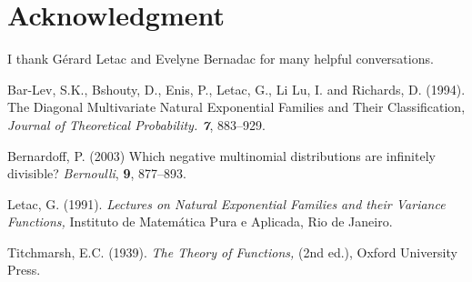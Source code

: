 \documentclass[a4paper,oneside,notitlepage]{article}%
\begin{document}
\section{Acknowledgment}

I thank G\'{e}rard Letac and Evelyne Bernadac for many helpful conversations.

\begin{thebibliography}{9}                                                                                                %


Bar-Lev, S.K., Bshouty, D., Enis, P., Letac, G., Li Lu, I. and
Richards, D. (1994). The Diagonal Multivariate Natural Exponential Families
and Their Classification, \textit{Journal of Theoretical Probability.
\textbf{7}}, 883--929.

Bernardoff, P. (2003) Which negative multinomial distributions are
infinitely divisible? \textit{Bernoulli}, \textbf{9}, 877--893.

Letac, G. (1991). \textit{Lectures on Natural Exponential Families
and their Variance Functions,} Instituto de Matem\'{a}tica Pura e Aplicada,
Rio de Janeiro.

Titchmarsh, E.C. (1939). \textit{The Theory of Functions,} (2nd
ed.), Oxford University Press.
\end{thebibliography}
\end{document}
